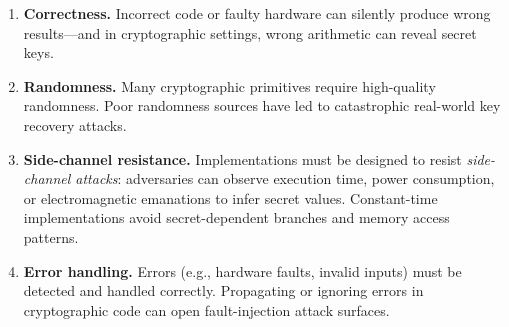 \documentclass[11pt]{article}
\theoremstyle{plain}
\theoremstyle{definition}
\begin{document}
\begin{enumerate}[label=(\arabic*)]
  \item \textbf{Correctness.}  Incorrect code or faulty hardware can
    silently produce wrong results---and in cryptographic settings,
    wrong arithmetic can reveal secret keys.

  \item \textbf{Randomness.}  Many cryptographic primitives require
    high-quality randomness.  Poor randomness sources have led to
    catastrophic real-world key recovery attacks.

  \item \textbf{Side-channel resistance.}  Implementations must be
    designed to resist \emph{side-channel attacks}: adversaries can
    observe execution time, power consumption, or electromagnetic
    emanations to infer secret values.  Constant-time implementations
    avoid secret-dependent branches and memory access patterns.

  \item \textbf{Error handling.}  Errors (e.g., hardware faults,
    invalid inputs) must be detected and handled correctly.
    Propagating or ignoring errors in cryptographic code can open
    fault-injection attack surfaces.
\end{enumerate}

\end{document}

